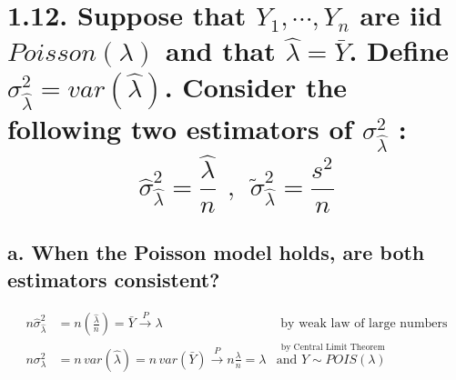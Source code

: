 \documentclass[
  letterpaper,
  DIV=11,
  numbers=noendperiod]{scrreprt}
\begin{document}
\hypertarget{suppose-that-y_1-cdots-y_n-are-iid-poissonlambda-and-that-hatlambda-bary.-define-sigma2_hatlambda-varhatlambda.-consider-the-following-two-estimators-of-sigma2_hatlambda-hatsigma2_hatlambda-frachatlambdantildesigma2_hatlambda-fracs2n}{%
\section{\texorpdfstring{1.12. Suppose that \(Y_1, \cdots, Y_n\) are iid
\(Poisson(\lambda)\) and that \(\hat{\lambda} = \bar{Y}\). Define
\(\sigma^2_{\hat{\lambda}} = var(\hat{\lambda})\). Consider the
following two estimators of \(\sigma^2_{\hat{\lambda}}\) :
\[\hat{\sigma}^2_{\hat{\lambda}} = \frac{\hat{\lambda}}{n}~~,~~\tilde{\sigma}^2_{\hat{\lambda}} = \frac{s^2}{n}\]}{1.12. Suppose that Y\_1, \textbackslash cdots, Y\_n are iid Poisson(\textbackslash lambda) and that \textbackslash hat\{\textbackslash lambda\} = \textbackslash bar\{Y\}. Define \textbackslash sigma\^{}2\_\{\textbackslash hat\{\textbackslash lambda\}\} = var(\textbackslash hat\{\textbackslash lambda\}). Consider the following two estimators of \textbackslash sigma\^{}2\_\{\textbackslash hat\{\textbackslash lambda\}\} : \textbackslash hat\{\textbackslash sigma\}\^{}2\_\{\textbackslash hat\{\textbackslash lambda\}\} = \textbackslash frac\{\textbackslash hat\{\textbackslash lambda\}\}\{n\}\textasciitilde\textasciitilde,\textasciitilde\textasciitilde\textbackslash tilde\{\textbackslash sigma\}\^{}2\_\{\textbackslash hat\{\textbackslash lambda\}\} = \textbackslash frac\{s\^{}2\}\{n\}}}\label{suppose-that-y_1-cdots-y_n-are-iid-poissonlambda-and-that-hatlambda-bary.-define-sigma2_hatlambda-varhatlambda.-consider-the-following-two-estimators-of-sigma2_hatlambda-hatsigma2_hatlambda-frachatlambdantildesigma2_hatlambda-fracs2n}}

\hypertarget{a.-when-the-poisson-model-holds-are-both-estimators-consistent}{%
\subsection{a. When the Poisson model holds, are both estimators
consistent?}\label{a.-when-the-poisson-model-holds-are-both-estimators-consistent}}

\[
\begin{aligned}
n\hat{\sigma}^2_{\hat{\lambda}} &= n\left(\frac{\hat{\lambda}}{n} \right) = \bar{Y} \overset{P}{\to} \lambda &\text{ by weak law of large numbers} \\
n{\sigma}^2_{{\lambda}} &= n \, var(\hat{\lambda}) =n\,var(\bar{Y}) \overset{P}{\to} n\frac{\lambda}{n} = \lambda & \overset{\text{ by Central Limit Theorem}}{\text{and } Y \sim POIS(\lambda)} \\
\end{aligned}
\]
\end{document}
